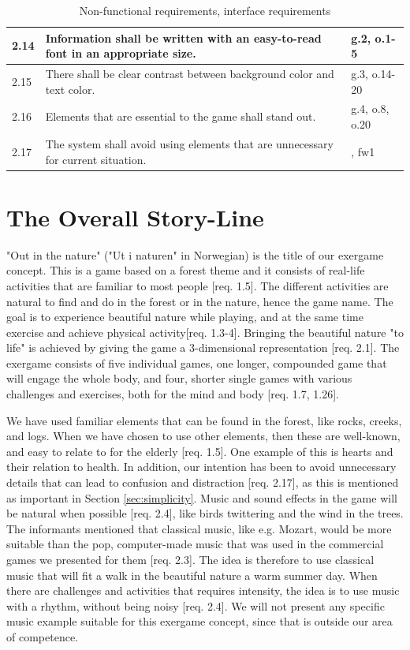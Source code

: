 \begin{table} [H]
\centering
\begin{tabular}{|>{\raggedright}p{}|p{}|p{}|} 
\hline
2.14 & Information shall be written with an easy-to-read font in an appropriate size. &  g.2, o.1-5\\ \hline
2.15 & There shall be clear contrast between background color and text color. & g.3, o.14-20 \\ \hline
2.16 & Elements that are essential to the game shall stand out. & g.4, o.8, o.20\\ \hline
2.17 & The system shall avoid using elements that are unnecessary for current situation.  & \cite{sweetser}, fw1\\ \hline
\end{tabular}
\caption[Non-functional requirements, part 2]{Non-functional requirements, interface requirements}
\label{tab:nfunc2}
\end{table} 

\section{The Overall Story-Line}
\label{sec:outinthenature}

"Out in the nature" ("Ut i naturen" in Norwegian) is the title of our exergame concept. This is a game based on a forest theme and it consists of real-life activities that are familiar to most people [req. 1.5]. The different activities are natural to find and do in the forest or in the nature, hence the game name. The goal is to experience beautiful nature while playing, and at the same time exercise and achieve physical activity[req. 1.3-4]. Bringing the beautiful nature "to life" is achieved by giving the game a 3-dimensional representation [req. 2.1]. The exergame consists of five individual games, one longer, compounded game that will engage the whole body, and four, shorter single games with various challenges and exercises, both for the mind and body [req. 1.7, 1.26].        

We have used familiar elements that can be found in the forest, like rocks, creeks, and logs. When we have chosen to use other elements, then these are well-known, and easy to relate to for the elderly [req. 1.5]. One example of this is hearts and their relation to health. In addition, our intention has been to avoid unnecessary details that can lead to confusion and distraction [req. 2.17], as this is mentioned as important in Section \ref{sec:simplicity}. Music and sound effects in the game will be natural when possible [req. 2.4], like birds twittering and the wind in the trees. The informants mentioned that classical music, like e.g. Mozart, would be more suitable than the pop, computer-made music that was used in the commercial games we presented for them [req. 2.3]. The idea is therefore to use classical music that will fit a walk in the beautiful nature a warm summer day. When there are challenges and activities that requires intensity, the idea is to use music with a rhythm, without being noisy [req. 2.4]. We will not present any specific music example suitable for this exergame concept, since that is outside our area of competence. 

